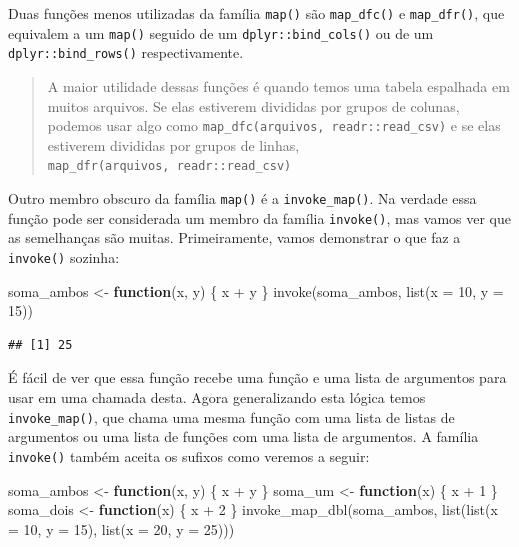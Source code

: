 \documentclass[
]{book}
\newenvironment{Shaded}{\begin{snugshade}}{\end{snugshade}}
\newcommand{\AttributeTok}[1]{\textcolor[rgb]{0.77,0.63,0.00}{#1}}
\newcommand{\ControlFlowTok}[1]{\textcolor[rgb]{0.13,0.29,0.53}{\textbf{#1}}}
\newcommand{\DecValTok}[1]{\textcolor[rgb]{0.00,0.00,0.81}{#1}}
\newcommand{\FunctionTok}[1]{\textcolor[rgb]{0.00,0.00,0.00}{#1}}
\newcommand{\NormalTok}[1]{#1}
\newcommand{\OtherTok}[1]{\textcolor[rgb]{0.56,0.35,0.01}{#1}}
\newcommand{\SpecialCharTok}[1]{\textcolor[rgb]{0.00,0.00,0.00}{#1}}
\begin{document}
Duas funções menos utilizadas da família \texttt{map()} são \texttt{map\_dfc()} e \texttt{map\_dfr()},
que equivalem a um \texttt{map()} seguido de um \texttt{dplyr::bind\_cols()} ou de um
\texttt{dplyr::bind\_rows()} respectivamente.

\begin{quote}
A maior utilidade dessas funções é quando temos uma tabela espalhada em muitos
arquivos. Se elas estiverem divididas por grupos de colunas, podemos usar algo
como \texttt{map\_dfc(arquivos,\ readr::read\_csv)} e se elas estiverem
divididas por grupos de linhas, \texttt{map\_dfr(arquivos,\ readr::read\_csv)}
\end{quote}

Outro membro obscuro da família \texttt{map()} é a \texttt{invoke\_map()}. Na verdade essa
função pode ser considerada um membro da família \texttt{invoke()}, mas vamos ver
que as semelhanças são muitas. Primeiramente, vamos demonstrar o que faz a
\texttt{invoke()} sozinha:

\begin{Shaded}
\begin{Highlighting}[]
\NormalTok{soma\_ambos }\OtherTok{\textless{}{-}} \ControlFlowTok{function}\NormalTok{(x, y) \{ x }\SpecialCharTok{+}\NormalTok{ y \}}
\FunctionTok{invoke}\NormalTok{(soma\_ambos, }\FunctionTok{list}\NormalTok{(}\AttributeTok{x =} \DecValTok{10}\NormalTok{, }\AttributeTok{y =} \DecValTok{15}\NormalTok{))}
\end{Highlighting}
\end{Shaded}

\begin{verbatim}
## [1] 25
\end{verbatim}

É fácil de ver que essa função recebe uma função e uma lista de argumentos para
usar em uma chamada desta. Agora generalizando esta lógica temos \texttt{invoke\_map()},
que chama uma mesma função com uma lista de listas de argumentos ou uma lista
de funções com uma lista de argumentos. A família \texttt{invoke()} também aceita os
sufixos como veremos a seguir:

\begin{Shaded}
\begin{Highlighting}[]
\NormalTok{soma\_ambos }\OtherTok{\textless{}{-}} \ControlFlowTok{function}\NormalTok{(x, y) \{ x }\SpecialCharTok{+}\NormalTok{ y \}}
\NormalTok{soma\_um }\OtherTok{\textless{}{-}} \ControlFlowTok{function}\NormalTok{(x) \{ x }\SpecialCharTok{+} \DecValTok{1}\NormalTok{ \}}
\NormalTok{soma\_dois }\OtherTok{\textless{}{-}} \ControlFlowTok{function}\NormalTok{(x) \{ x }\SpecialCharTok{+} \DecValTok{2}\NormalTok{ \}}
\FunctionTok{invoke\_map\_dbl}\NormalTok{(soma\_ambos, }\FunctionTok{list}\NormalTok{(}\FunctionTok{list}\NormalTok{(}\AttributeTok{x =} \DecValTok{10}\NormalTok{, }\AttributeTok{y =} \DecValTok{15}\NormalTok{), }\FunctionTok{list}\NormalTok{(}\AttributeTok{x =} \DecValTok{20}\NormalTok{, }\AttributeTok{y =} \DecValTok{25}\NormalTok{)))}
\end{Highlighting}
\end{Shaded}
\end{document}
